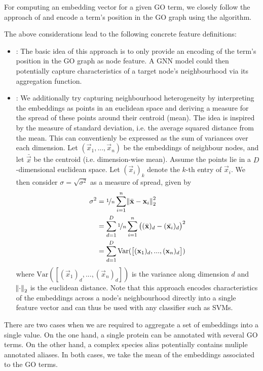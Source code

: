 \documentclass[
	fontsize=10pt, %
	twoside=true, %
	secnumdepth=1, %
  toc=indentunnumbered %
]{kaobook}
\begin{document}
For computing an embedding vector for a given GO term, we closely follow the
approach of \citeauthor{zhong_GO2VecTransformingGO_2020}
\cite{zhong_GO2VecTransformingGO_2020} and encode a term's position in the GO
graph using the  algorithm.

The above considerations lead to the following concrete feature definitions:
\begin{itemize}
\item {}: The basic idea of this approach is to only provide an
  encoding of the term's position in the GO graph as node feature. A GNN model
  could then potentially capture characteristics of a target node's
  neighbourhood via its aggregation function.
\item {}: We additionally try capturing neighbourhood
  heterogeneity by interpreting the embeddings as points in an euclidean space
  and deriving a measure for the spread of these points around their centroid
  (mean). The idea is inspired by the measure of standard deviation, i.e. the
  average squared distance from the mean. This can conventienly be expressed as
  the sum of variances over each dimension. Let $(\vec x_1, ..., \vec x_n)$ be
  the embeddings of neighbour nodes, and let $\bar{\vec x}$ be the centroid
  (i.e. dimension-wise mean). Assume the points lie in a $D$-dimensional
  euclidean space. Let $(\vec x_i)_k$ denote the $k$-th entry of $\vec x_i$. We
  then consider $\sigma = \sqrt{\sigma^2}$ as a measure of spread, given by
  \begin{align*}
    \sigma^2 &= \nicefrac{1}{n} \sum_{i=1}^n \norm{\bar{\mathbf{x}} - \mathbf{x}_i}_2^2 \\
             &= \sum_{d=1}^D \nicefrac{1}{n} \sum_{i=1}^n
               \left( (\bar{\mathbf{x}})_d - (\bar{\mathbf{x}_i})_d\right)^2 \\
             &= \sum_{d=1}^D \text{Var}(\left[
               (\mathbf{x}_1)_d, ..., (\mathbf{x}_n)_d
               \right])
  \end{align*}
  where $\text{Var}(\left[(\vec x_1)_d, ..., (\vec x_n)_d \right])$ is the
  variance along dimension $d$ and $\norm{\cdot}_2$ is the euclidean distance.
  Note that this approach encodes characteristics of the embeddings across a
  node's neighbourhood directly into a single feature vector and can thus be
  used with any classifier such as SVMs.
\end{itemize}
There are two cases when we are required to
aggregate a set of embeddings into a single value. On the one hand, a single
protein can be annotated with several GO terms. On the other hand, a complex
species alias potentially contains muliple annotated aliases. In both cases,
we take the mean of the embeddings associated to the GO terms.
\end{document}
